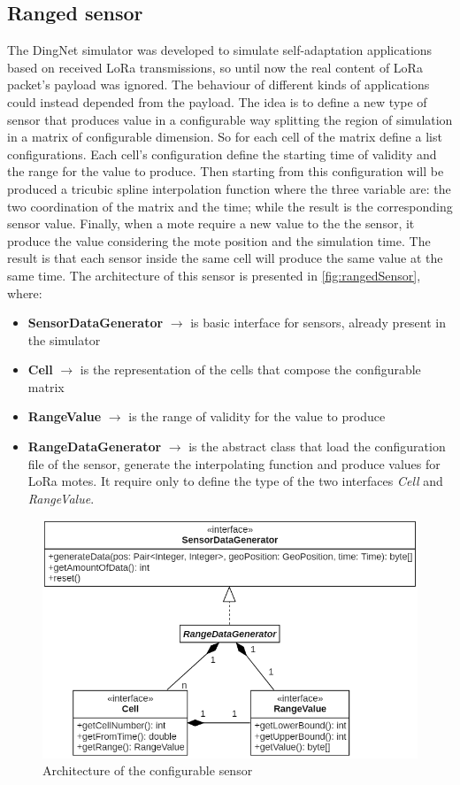 \subsection{Ranged sensor}
The DingNet simulator was developed to simulate self-adaptation applications based on received LoRa transmissions, so until now the real content of LoRa packet's payload was ignored.
The behaviour of different kinds of applications could instead depended from the payload. 
The idea is to define a new type of sensor that produces value in a configurable way splitting the region of simulation in a matrix of configurable dimension. 
So for each cell of the matrix define a list configurations. 
Each cell's configuration define the starting time of validity and the range for the value to produce. 
Then starting from this configuration will be produced a tricubic spline interpolation function where the three variable are: the two coordination of the matrix and the time; while the result is the corresponding sensor value.
Finally, when a mote require a new value to the the sensor, it produce the value considering the mote position and the simulation time.
The result is that each sensor inside the same cell will produce the same value at the same time. 
The architecture of this sensor is presented in \autoref{fig:rangedSensor}, where:
\begin{itemize}
    \item \textbf{SensorDataGenerator} $\rightarrow$ is basic interface for sensors, already present in the simulator
    \item \textbf{Cell} $\rightarrow$ is the representation of the cells that compose the configurable matrix
    \item \textbf{RangeValue} $\rightarrow$ is the range of validity for the value to produce
    \item \textbf{RangeDataGenerator} $\rightarrow$ is the abstract class that load the configuration file of the sensor, generate the interpolating function and produce values for LoRa motes. It require only to define the type of the two interfaces \textit{Cell} and \textit{RangeValue}.
\end{itemize}
% 
\begin{figure}[h]
    \centering
    \includegraphics[scale=0.7]{figures/rangedSensor.png}
    \caption{Architecture of the configurable sensor}
    \label{fig:rangedSensor}
\end{figure}
